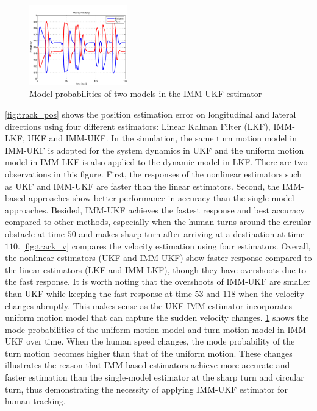 \documentclass[letterpaper, 10 pt, conference]{ieeeconf}
\newcommand{\todonote}[1]{\vspace{0px} %
	\todo[inline, color=green!30]{\textbf{[Note:]} {#1}} %
}
\begin{document}
	\begin{figure}
		\centering
		\includegraphics[width=0.38\textwidth]{figures/mode_prob}
		\caption{Model probabilities of two models in the IMM-UKF estimator}
		\label{fig:mode_prob}
	\end{figure}
	\cref{fig:track_pos} shows the position estimation error on longitudinal and lateral directions using four different estimators: Linear Kalman Filter (LKF), IMM-LKF, UKF and IMM-UKF. 
	In the simulation, the same turn motion model in IMM-UKF is adopted for the system dynamics in UKF and the uniform motion model in IMM-LKF is also applied to the dynamic model in LKF.  
	There are two observations in this figure. First, the responses of the nonlinear estimators such as UKF and IMM-UKF are faster than the linear estimators. Second, the IMM-based approaches show better performance in accuracy than the single-model approaches.
	Besided, IMM-UKF achieves the fastest response and best accuracy compared to other methods, especially when the human turns around the circular obstacle at time $50$ and makes sharp turn after arriving at a destination at time $110$. 
	\cref{fig:track_v} compares the velocity estimation using four estimators.
	Overall, the nonlinear estimators (UKF and IMM-UKF) show faster response compared to the linear estimators (LKF and IMM-LKF), though they have overshoots due to the fast response. 
	It is worth noting that the overshoots of IMM-UKF are smaller than UKF while keeping the fast response at time $53$ and $118$ when the velocity changes abruptly.    
	This makes sense as the UKF-IMM estimator incorporates uniform motion model that can capture the sudden velocity changes.
	\cref{fig:mode_prob} shows the mode probabilities of the uniform motion model and turn motion model in IMM-UKF over time.
	When the human speed changes, the mode probability of the turn motion becomes higher than that of the uniform motion. 
	These changes illustrates the reason that IMM-based estimators achieve more accurate and faster estimation than the single-model estimator at the sharp turn and circular turn, thus demonstrating the necessity of applying IMM-UKF estimator for human tracking.
	
\end{document}
